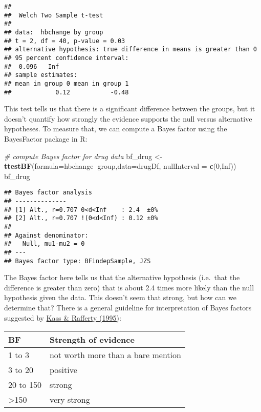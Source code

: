 \documentclass[]{book}
\newenvironment{Shaded}{\begin{snugshade}}{\end{snugshade}}
\newcommand{\KeywordTok}[1]{\textcolor[rgb]{0.13,0.29,0.53}{\textbf{#1}}}
\newcommand{\DataTypeTok}[1]{\textcolor[rgb]{0.13,0.29,0.53}{#1}}
\newcommand{\DecValTok}[1]{\textcolor[rgb]{0.00,0.00,0.81}{#1}}
\newcommand{\StringTok}[1]{\textcolor[rgb]{0.31,0.60,0.02}{#1}}
\newcommand{\CommentTok}[1]{\textcolor[rgb]{0.56,0.35,0.01}{\textit{#1}}}
\newcommand{\OtherTok}[1]{\textcolor[rgb]{0.56,0.35,0.01}{#1}}
\newcommand{\OperatorTok}[1]{\textcolor[rgb]{0.81,0.36,0.00}{\textbf{#1}}}
\newcommand{\NormalTok}[1]{#1}
\theoremstyle{definition}
\theoremstyle{definition}
\theoremstyle{definition}
\theoremstyle{remark}
\begin{document}
\begin{verbatim}
## 
##  Welch Two Sample t-test
## 
## data:  hbchange by group
## t = 2, df = 40, p-value = 0.03
## alternative hypothesis: true difference in means is greater than 0
## 95 percent confidence interval:
##  0.096   Inf
## sample estimates:
## mean in group 0 mean in group 1 
##            0.12           -0.48
\end{verbatim}

This test tells us that there is a significant difference between the
groups, but it doesn't quantify how strongly the evidence supports the
null versus alternative hypotheses. To measure that, we can compute a
Bayes factor using the BayesFactor package in R:

\begin{Shaded}
\begin{Highlighting}[]
\CommentTok{# compute Bayes factor for drug data}
\NormalTok{bf_drug <-}\StringTok{ }\KeywordTok{ttestBF}\NormalTok{(}\DataTypeTok{formula=}\NormalTok{hbchange}\OperatorTok{~}\NormalTok{group,}\DataTypeTok{data=}\NormalTok{drugDf,}
                  \DataTypeTok{nullInterval =} \KeywordTok{c}\NormalTok{(}\DecValTok{0}\NormalTok{,}\OtherTok{Inf}\NormalTok{))}
\NormalTok{bf_drug}
\end{Highlighting}
\end{Shaded}

\begin{verbatim}
## Bayes factor analysis
## --------------
## [1] Alt., r=0.707 0<d<Inf    : 2.4  ±0%
## [2] Alt., r=0.707 !(0<d<Inf) : 0.12 ±0%
## 
## Against denominator:
##   Null, mu1-mu2 = 0 
## ---
## Bayes factor type: BFindepSample, JZS
\end{verbatim}

The Bayes factor here tells us that the alternative hypothesis
(i.e.~that the difference is greater than zero) that is about 2.4 times
more likely than the null hypothesis given the data. This doesn't seem
that strong, but how can we determine that? There is a general guideline
for interpretation of Bayes factors suggested by
\href{https://www.andrew.cmu.edu/user/kk3n/simplicity/KassRaftery1995.pdf}{Kass
\& Rafferty (1995)}:

\begin{longtable}[]{@{}ll@{}}
\toprule
BF & Strength of evidence\tabularnewline
\midrule
\endhead
1 to 3 & not worth more than a bare mention\tabularnewline
3 to 20 & positive\tabularnewline
20 to 150 & strong\tabularnewline
\textgreater{}150 & very strong\tabularnewline
\bottomrule
\end{longtable}
\end{document}
